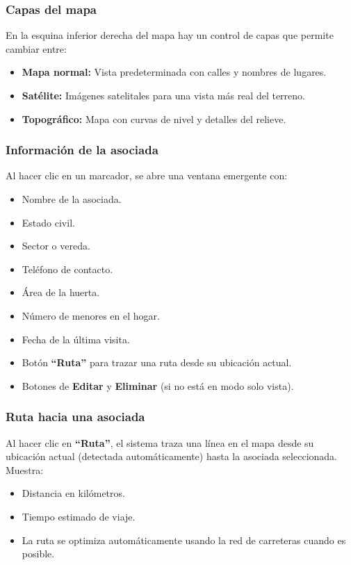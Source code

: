 \documentclass[12pt]{article}
\begin{document}
\subsubsection{Capas del mapa}
En la esquina inferior derecha del mapa hay un control de capas que permite cambiar entre:
\begin{itemize}[nosep]
  \item \textbf{Mapa normal:} Vista predeterminada con calles y nombres de lugares.
  \item \textbf{Satélite:} Imágenes satelitales para una vista más real del terreno.
  \item \textbf{Topográfico:} Mapa con curvas de nivel y detalles del relieve.
\end{itemize}

\subsubsection{Información de la asociada}
Al hacer clic en un marcador, se abre una ventana emergente con:
\begin{itemize}[nosep]
  \item Nombre de la asociada.
  \item Estado civil.
  \item Sector o vereda.
  \item Teléfono de contacto.
  \item Área de la huerta.
  \item Número de menores en el hogar.
  \item Fecha de la última visita.
  \item Botón \textbf{``Ruta''} para trazar una ruta desde su ubicación actual.
  \item Botones de \textbf{Editar} y \textbf{Eliminar} (si no está en modo solo vista).
\end{itemize}

\subsubsection{Ruta hacia una asociada}
Al hacer clic en \textbf{``Ruta''}, el sistema traza una línea en el mapa desde su ubicación actual (detectada automáticamente) hasta la asociada seleccionada. Muestra:
\begin{itemize}[nosep]
  \item Distancia en kilómetros.
  \item Tiempo estimado de viaje.
  \item La ruta se optimiza automáticamente usando la red de carreteras cuando es posible.
\end{itemize}
\end{document}

